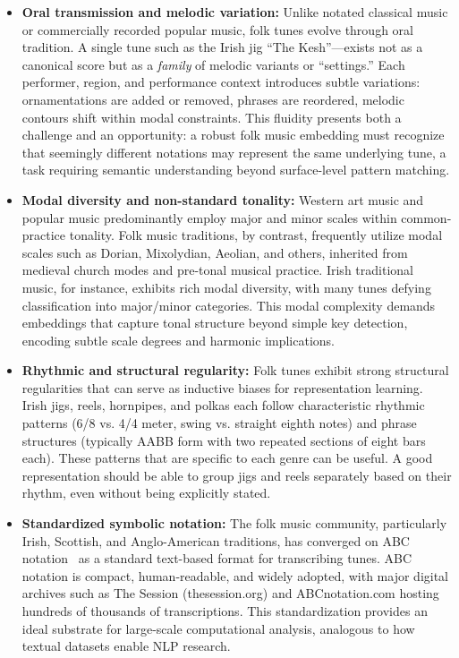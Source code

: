 \documentclass[]{interact}
\theoremstyle{plain}
\theoremstyle{definition}
\theoremstyle{remark}
\begin{document}
\begin{itemize}
\item \textbf{Oral transmission and melodic variation:} Unlike notated classical music or commercially recorded popular music, folk tunes evolve through oral tradition. A single tune such as the Irish jig ``The Kesh''---exists not as a canonical score but as a \textit{family} of melodic variants or ``settings.'' Each performer, region, and performance context introduces subtle variations: ornamentations are added or removed, phrases are reordered, melodic contours shift within modal constraints. This fluidity presents both a challenge and an opportunity: a robust folk music embedding must recognize that seemingly different notations may represent the same underlying tune, a task requiring semantic understanding beyond surface-level pattern matching.

\item \textbf{Modal diversity and non-standard tonality:} Western art music and popular music predominantly employ major and minor scales within common-practice tonality. Folk music traditions, by contrast, frequently utilize modal scales such as Dorian, Mixolydian, Aeolian, and others, inherited from medieval church modes and pre-tonal musical practice. Irish traditional music, for instance, exhibits rich modal diversity, with many tunes defying classification into major/minor categories. This modal complexity demands embeddings that capture tonal structure beyond simple key detection, encoding subtle scale degrees and harmonic implications.

\item \textbf{Rhythmic and structural regularity:} Folk tunes exhibit strong structural regularities that can serve as inductive biases for representation learning. Irish jigs, reels, hornpipes, and polkas each follow characteristic rhythmic patterns (6/8 vs. 4/4 meter, swing vs. straight eighth notes) and phrase structures (typically AABB form with two repeated sections of eight bars each). These patterns that are specific to each genre can be useful. A good representation should be able to group jigs and reels separately based on their rhythm, even without being explicitly stated.

\item \textbf{Standardized symbolic notation:} The folk music community, particularly Irish, Scottish, and Anglo-American traditions, has converged on ABC notation~\cite{ABCNotation2011} as a standard text-based format for transcribing tunes. ABC notation is compact, human-readable, and widely adopted, with major digital archives such as The Session (thesession.org) and ABCnotation.com hosting hundreds of thousands of transcriptions. This standardization provides an ideal substrate for large-scale computational analysis, analogous to how textual datasets enable NLP research.


\end{itemize}
\end{document}
